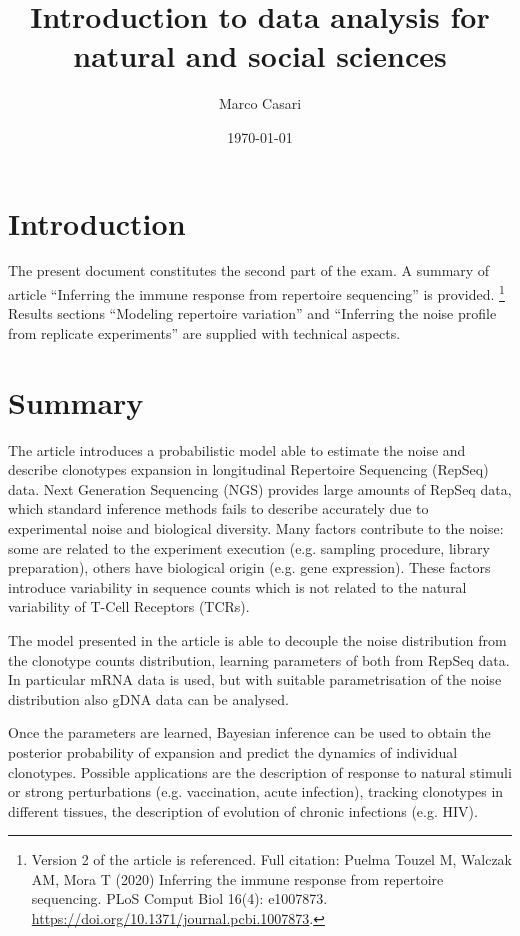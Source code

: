 \documentclass[a4paper,twocolumn]{article}
\title{Introduction to data analysis for natural and social sciences}
\author{Marco Casari}
\date{\today}
\begin{document}
\maketitle

\section{Introduction}
The present document constitutes the second part of the exam. A summary of article ``Inferring the immune response from repertoire sequencing'' is provided.%
\footnote{Version 2 of the article is referenced. Full citation: Puelma Touzel M, Walczak AM, Mora T (2020) Inferring the immune response from repertoire sequencing. PLoS Comput Biol 16(4): e1007873. \url{https://doi.org/10.1371/journal.pcbi.1007873}.}
Results sections ``Modeling repertoire variation'' and ``Inferring the noise profile from replicate experiments'' are supplied with technical aspects.

\section{Summary}
The article introduces a probabilistic model able to estimate the noise and describe clonotypes expansion in longitudinal Repertoire Sequencing (RepSeq) data.
Next Generation Sequencing (NGS) provides large amounts of RepSeq data, which standard inference methods fails to describe accurately due to experimental noise and biological diversity. Many factors contribute to the noise: some are related to the experiment execution (e.g. sampling procedure, library preparation), others have biological origin (e.g. gene expression). These factors introduce variability in sequence counts which is not related to the natural variability of T-Cell Receptors (TCRs).

The model presented in the article is able to decouple the noise distribution from the clonotype counts distribution, learning parameters of both from RepSeq data. In particular mRNA data is used, but with suitable  parametrisation of the noise distribution also gDNA data can be analysed.

Once the parameters are learned, Bayesian inference can be used to obtain the posterior probability of expansion and predict the dynamics of individual clonotypes.
Possible applications are the description of response to natural stimuli or strong perturbations (e.g. vaccination, acute infection), tracking clonotypes in different tissues, the description of evolution of chronic infections (e.g. HIV).
\end{document}
